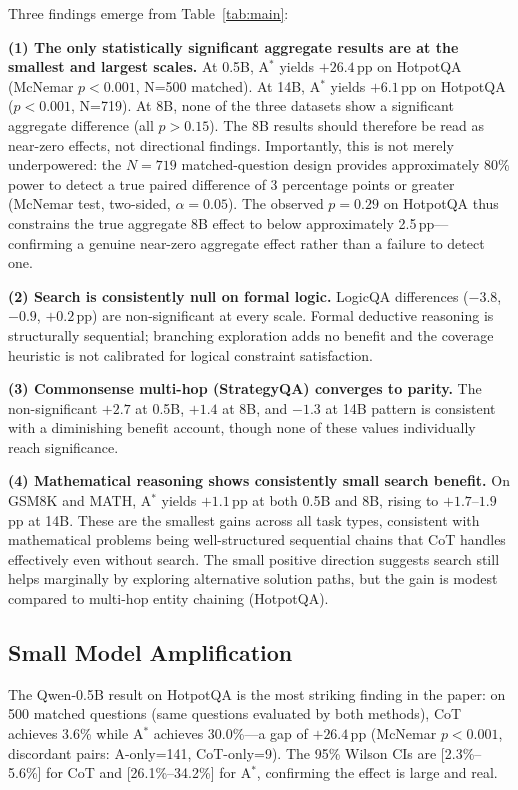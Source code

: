 \documentclass{article}
\newcommand{\astar}{A$^*$\xspace}
\begin{document}
Three findings emerge from Table~\ref{tab:main}:

\textbf{(1) The only statistically significant aggregate results are at the smallest and largest scales.}
At 0.5B, \astar yields $+26.4$\,pp on HotpotQA (McNemar $p<0.001$, N=500 matched).
At 14B, \astar yields $+6.1$\,pp on HotpotQA ($p<0.001$, N=719).
At 8B, none of the three datasets show a significant aggregate difference (all $p>0.15$).
The 8B results should therefore be read as near-zero effects, not directional findings.
Importantly, this is not merely underpowered: the $N=719$ matched-question design provides approximately 80\% power to detect a true paired difference of 3 percentage points or greater (McNemar test, two-sided, $\alpha=0.05$). The observed $p=0.29$ on HotpotQA thus constrains the true aggregate 8B effect to below approximately 2.5\,pp---confirming a genuine near-zero aggregate effect rather than a failure to detect one.

\textbf{(2) Search is consistently null on formal logic.}
LogicQA differences ($-3.8$, $-0.9$, $+0.2$\,pp) are non-significant at every scale.
Formal deductive reasoning is structurally sequential; branching exploration adds no benefit
and the coverage heuristic is not calibrated for logical constraint satisfaction.

\textbf{(3) Commonsense multi-hop (StrategyQA) converges to parity.}
The non-significant $+2.7$ at 0.5B, $+1.4$ at 8B, and $-1.3$ at 14B pattern is consistent
with a diminishing benefit account, though none of these values individually reach significance.

\textbf{(4) Mathematical reasoning shows consistently small search benefit.}
On GSM8K and MATH, \astar yields $+1.1$\,pp at both 0.5B and 8B, rising to $+1.7$--$1.9$\,pp at 14B.
These are the smallest gains across all task types, consistent with mathematical problems being well-structured sequential chains that CoT handles effectively even without search.
The small positive direction suggests search still helps marginally by exploring alternative solution paths, but the gain is modest compared to multi-hop entity chaining (HotpotQA).

\subsection{Small Model Amplification}
\label{sec:amplification}

The Qwen-0.5B result on HotpotQA is the most striking finding in the paper: on 500 matched questions (same questions evaluated by both methods), CoT achieves 3.6\% while \astar achieves 30.0\%---a gap of $+26.4$\,pp (McNemar $p<0.001$, discordant pairs: A\*-only=141, CoT-only=9). The 95\% Wilson CIs are [2.3\%--5.6\%] for CoT and [26.1\%--34.2\%] for \astar, confirming the effect is large and real.
\end{document}
